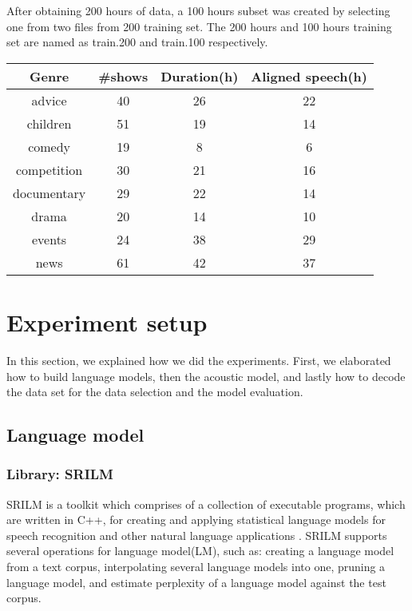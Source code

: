  After obtaining 200 hours of data, a 100 hours subset was created by selecting one from two files from 200 training set. The 200 hours and 100 hours training set are named as train.200 and train.100 respectively. 

\begin{center}
\label{statisticstrain200}
\begin{tabular}{ | c | c | c | c|}
\hline
\textbf{Genre} & \textbf{\#shows}  & \textbf{Duration(h)} & Aligned speech(h) \\ \hline \hline
advice & 40 & 26 & 22 \\ \hline
children & 51 & 19 & 14 \\ \hline
comedy & 19 & 8 & 6 \\ \hline
competition & 30 & 21 & 16 \\ \hline
documentary & 29 & 22 & 14 \\ \hline
drama & 20 & 14 & 10 \\ \hline
events & 24 & 38 & 29 \\ \hline
news & 61 & 42 & 37 \\ \hline
\end{tabular}
\end{center}



\section{Experiment setup}
In this section, we explained how we did the experiments. First, we elaborated how to build language models,  then the acoustic model, and lastly how to decode the data set for the data selection and the model evaluation.

\subsection{Language model}
\subsubsection{Library: SRILM}
SRILM is a toolkit which comprises of a collection of executable programs, which are written in C++, for creating and applying statistical language models for speech recognition and other natural language applications \cite{Stolcke02srilm}. SRILM supports several operations for language model(LM), such as: creating a language model from a text corpus, interpolating several language models into one, pruning a language model, and estimate perplexity of a language model against the test corpus. 

